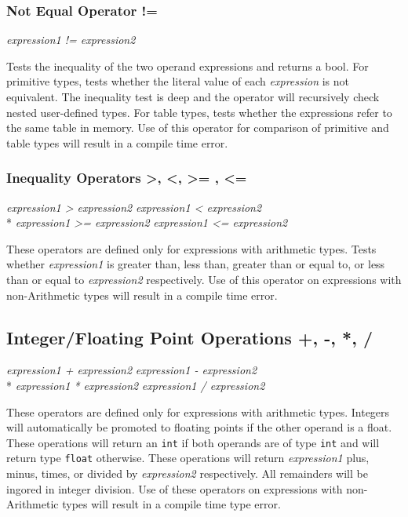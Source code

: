 \subsubsection{Not Equal Operator !=}
\begin{center}
\textsl{expression1 != expression2}
\end{center}
Tests the inequality of the two operand expressions and returns a bool. For primitive types, 
tests whether the literal value of each \textsl{expression} is not equivalent. The inequality 
test is deep and the operator will recursively check nested user-defined types. For table 
types, tests whether the expressions refer to the same table in memory. Use of this operator 
for comparison of primitive and table types will result in a compile time error.

\subsubsection{Inequality Operators \textgreater , \textless , \textgreater= , \textless=}
\begin{center}
\textsl{expression1 \textgreater \hspace{1pt} expression2}
\textsl{expression1 \textless  \hspace{1pt} expression2}\\*
\textsl{expression1 \textgreater= expression2}
\textsl{expression1 \textless= expression2}
\end{center}
These operators are defined only for expressions with arithmetic types. Tests whether 
\textsl{expression1} is greater than, less than, greater than or equal to, or less than 
or equal to \textsl{expression2} respectively. Use of this operator on expressions with 
non-Arithmetic types will result in a compile time error.

\subsection{Integer/Floating Point Operations +, -, *, /}
\begin{center}
\textsl{expression1 + expression2}
\textsl{expression1 - expression2}\\*
\textsl{expression1 * expression2}
\textsl{expression1 / expression2}
\end{center}
These operators are defined only for expressions with arithmetic types. Integers will 
automatically be promoted to floating points if the other operand is a float. These operations 
will return an \texttt{int} if both operands are of type \texttt{int} and will return type 
\texttt{float} otherwise. These operations will return \textsl{expression1} plus, minus, times, or
divided by \textsl{expression2} respectively. All remainders will be ingored in integer division. 
Use of these operators on expressions with non-Arithmetic types will result in a compile time type error.

